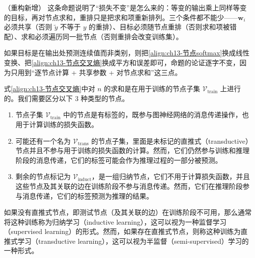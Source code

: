 \documentclass[../../main.tex]{subfiles}
\begin{document}
\begin{remark}（重构新增）
这条命题说明了“损失不变”是怎么来的：等变的输出乘上同样等变的目标，再对节点求和，重排只是把求和项重新排列。三个条件都不能少——$\bm{w}_i$ 必须共享（否则 $\widetilde{y}$ 不等于 $y$ 的重排）、目标必须随节点重排（否则求和项被错配）、求和必须遍历同一批节点（否则重排会改变训练集）。\par
如果目标是在输出处预测连续值而非类别，则把\eqref{align:ch13-节点softmax}换成线性变换、把\eqref{align:ch13-节点交叉熵}换成平方和误差即可，命题的论证逐字不变，因为只用到“逐节点计算 + 共享参数 + 对节点求和”这三点。
\end{remark}

式\eqref{align:ch13-节点交叉熵}中对 $n$ 的求和是在用于训练的节点子集 $\mathcal{V}_{\mathrm{train}}$ 上进行的。我们需要区分以下 3 种类型的节点。

\begin{enumerate}[label=（\arabic*）]
\item 节点子集 $\mathcal{V}_{\mathrm{train}}$ 中的节点是有标签的，既参与图神经网络的消息传递操作，也用于计算训练的损失函数。
\item 可能还有一个名为 $\mathcal{V}_{\mathrm{trans}}$ 的节点子集，里面是未标记的直推式（transductive）节点并且不参与用于训练的损失函数的计算。然而，它们仍然参与训练和推理阶段的消息传递，它们的标签可能会作为推理过程的一部分被预测。
\item 剩余的节点标记为 $\mathcal{V}_{\mathrm{induct}}$，是一组归纳节点，它们不用于计算损失函数，并且这些节点及其关联的边在训练阶段不参与消息传递。然而，它们在推理阶段参与消息传递，它们的标签预测为推理的结果。
\end{enumerate}

\begin{definition}[归纳学习与直推式学习]\label{definition:ch13-归纳与直推学习}
如果没有直推式节点，即测试节点（及其关联的边）在训练阶段不可用，那么通常将这种训练称为归纳学习（inductive learning），这可以视为一种监督学习（supervised learning）的形式。然而，如果存在直推式节点，则称这种训练为直推式学习（transductive learning），这可以视为半监督（semi-supervised）学习的一种形式。
\end{definition}
\end{document}
